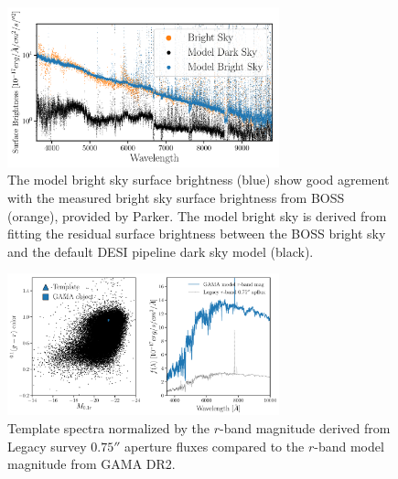 \documentclass[12pt, letterpaper, preprint]{aastex}
\begin{document}
\begin{figure}
\begin{center}
    \includegraphics[width=0.7\textwidth]{figs/model_skySurfBright.pdf}
    \caption{The model bright sky surface brightness (blue) show good 
    agrement with the measured bright sky surface brightness from BOSS 
    (orange), provided by Parker. The model bright sky is derived from 
    fitting the residual surface brightness between the BOSS bright sky 
    and the default DESI pipeline dark sky model (black).}
\label{fig:sky_sbright}
\end{center}
\end{figure}


\begin{figure}
\begin{center}
    \includegraphics[width=0.7\textwidth]{figs/GLeg_rMag_norm.pdf} 
    \caption{Template spectra normalized by the $r$-band magnitude 
    derived from Legacy survey $0.75''$ aperture fluxes compared to 
    the $r$-band model magnitude from GAMA DR2.}
\label{fig:rmag_norm}
\end{center}
\end{figure}

%
\end{document}
